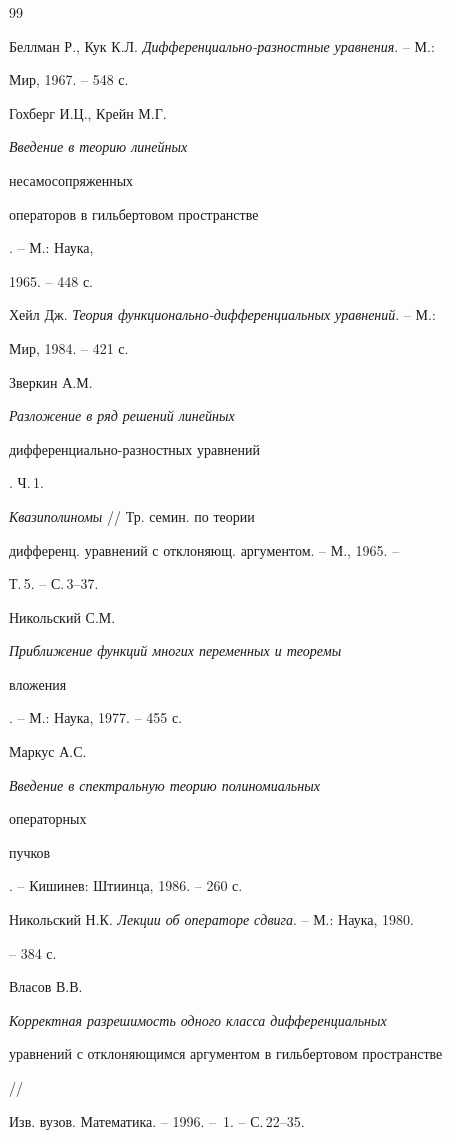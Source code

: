 \begin{thebibliography}{99} 


 




Беллман Р., Кук К.Л. {\em Дифференциально-разностные уравнения}. -- М.: 


Мир, 1967. -- 548 с. 




Гохберг И.Ц., Крейн М.Г. {\em Введение в теорию линейных 


несамосопряженных 


операторов в гильбертовом пространстве}. -- М.: Наука, 


1965. -- 448 с. 




Хейл Дж. {\em Теория функционально-дифференциальных уравнений}. -- М.: 


Мир, 1984. -- 421 с. 




Зверкин А.М. {\em Разложение в ряд решений линейных 


дифференциально-разностных уравнений}. Ч.\,1. 


{\em Квазиполиномы} // Тр. семин. по теории 


дифференц. уравнений с отклоняющ. аргументом. -- М., 1965. -- 


Т.\,5. -- С.\,3--37. 




Никольский С.М. {\em Приближение функций многих переменных и теоремы 


вложения}. -- М.: Наука, 1977. -- 455 с. 




Маркус А.С. {\em Введение в спектральную теорию полиномиальных 


операторных 


пучков}. -- Кишинев: Штиинца, 1986. -- 260 с. 




Никольский Н.К. {\em Лекции об операторе сдвига}. -- М.: Наука, 1980. 


-- 384 с. 




Власов В.В. {\em Корректная разрешимость одного класса дифференциальных 


уравнений с отклоняющимся аргументом в гильбертовом пространстве} // 


Изв. вузов. Математика. -- 1996. -- \No\,1. -- С.\,22--35. 



\end{thebibliography}
